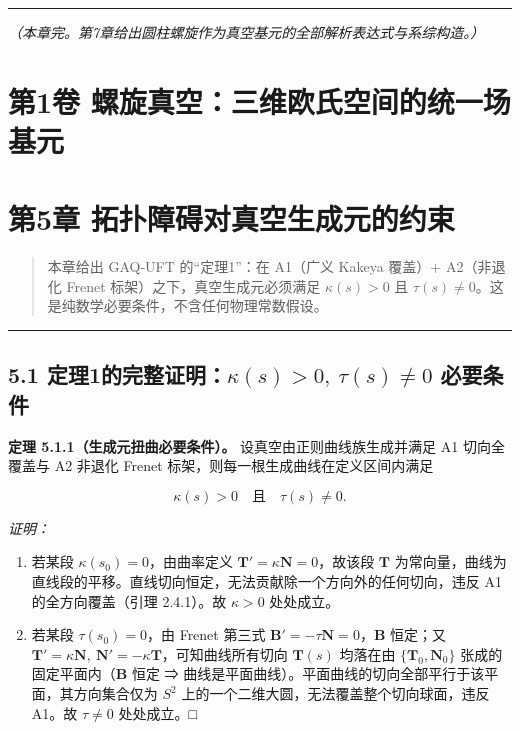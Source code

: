 \begin{center}\rule{0.5\linewidth}{0.5pt}\end{center}

\emph{（本章完。第7章给出圆柱螺旋作为真空基元的全部解析表达式与系综构造。）}

\section{第1卷
螺旋真空：三维欧氏空间的统一场基元}\label{ux7b2c1ux5377-ux87baux65cbux771fux7a7aux4e09ux7ef4ux6b27ux6c0fux7a7aux95f4ux7684ux7edfux4e00ux573aux57faux5143}

\section{第5章
拓扑障碍对真空生成元的约束}\label{ux7b2c5ux7ae0-ux62d3ux6251ux969cux788dux5bf9ux771fux7a7aux751fux6210ux5143ux7684ux7ea6ux675f-1}

\begin{quote}
本章给出 GAQ‑UFT 的``定理1''：在 A1（广义 Kakeya 覆盖）+ A2（非退化
Frenet 标架）之下，真空生成元必须满足 \(\kappa(s)>0\) 且
\(\tau(s)\neq 0\)。这是纯数学必要条件，不含任何物理常数假设。
\end{quote}

\begin{center}\rule{0.5\linewidth}{0.5pt}\end{center}

\subsection{\texorpdfstring{5.1
定理1的完整证明：\(\kappa(s)>0,\ \tau(s)\neq0\)
必要条件}{5.1 定理1的完整证明：\textbackslash kappa(s)\textgreater0,\textbackslash{} \textbackslash tau(s)\textbackslash neq0 必要条件}}\label{ux5b9aux74061ux7684ux5b8cux6574ux8bc1ux660ekappas0-tausneq0-ux5fc5ux8981ux6761ux4ef6}

\textbf{定理 5.1.1（生成元扭曲必要条件）。} 设真空由正则曲线族生成并满足
A1 切向全覆盖与 A2 非退化 Frenet 标架，则每一根生成曲线在定义区间内满足

\[
\kappa(s)>0\quad\text{且}\quad \tau(s)\neq 0.
\]

\emph{证明：}

\begin{enumerate}
\def\labelenumi{(\arabic{enumi})}
\item
  若某段 \(\kappa(s_0)=0\)，由曲率定义
  \(\mathbf{T}'=\kappa\mathbf{N}=0\)，故该段 \(\mathbf{T}\)
  为常向量，曲线为直线段的平移。直线切向恒定，无法贡献除一个方向外的任何切向，违反
  A1 的全方向覆盖（引理 2.4.1）。故 \(\kappa>0\) 处处成立。
\item
  若某段 \(\tau(s_0)=0\)，由 Frenet 第三式
  \(\mathbf{B}'=-\tau\mathbf{N}=0\)，\(\mathbf{B}\) 恒定；又
  \(\mathbf{T}'=\kappa\mathbf{N},\ \mathbf{N}'=-\kappa\mathbf{T}\)，可知曲线所有切向
  \(\mathbf{T}(s)\) 均落在由 \(\{\mathbf{T}_0,\mathbf{N}_0\}\)
  张成的固定平面内（\(\mathbf{B}\) 恒定 ⇒
  曲线是平面曲线）。平面曲线的切向全部平行于该平面，其方向集合仅为
  \(S^2\) 上的一个二维大圆，无法覆盖整个切向球面，违反 A1。故
  \(\tau\neq0\) 处处成立。□
\end{enumerate}

